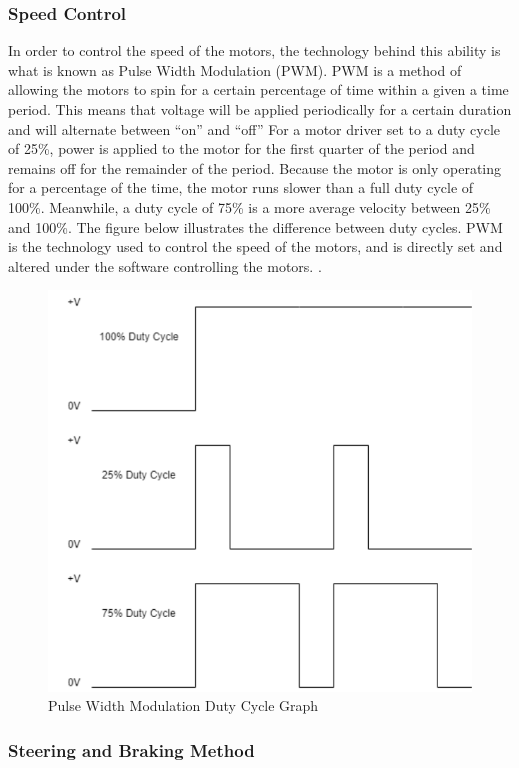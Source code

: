 \subsubsection{Speed Control}
\noindent In order to control the speed of the motors, the technology behind this ability is what is known as Pulse Width Modulation (PWM). PWM is a method of allowing the motors to spin for a certain percentage of time within a given a time period. This means that voltage will be applied periodically for a certain duration and will alternate between “on” and “off” For a motor driver set to a duty cycle of 25\%, power is applied to the motor for the first quarter of the period and remains off for the remainder of the period. Because the motor is only operating for a percentage of the time, the motor runs slower than a full duty cycle of 100\%. Meanwhile, a duty cycle of 75\% is a more average velocity between 25\% and 100\%. The figure below illustrates the difference between duty cycles. PWM is the technology used to control the speed of the motors, and is directly set and altered under the software controlling the motors. \cite{etechsparks}. \\

\begin{figure}[H]
	\centering
	\includegraphics[width=.65\textwidth]{./Images/pwm.png}
	\caption{\label{fig:pwm}Pulse Width Modulation Duty Cycle Graph}
\end{figure}


\subsubsection{Steering and Braking Method }
\noindent 

